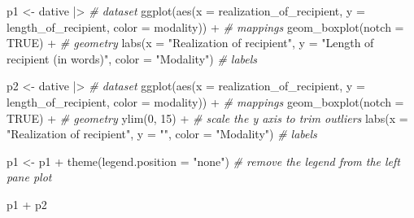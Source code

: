 \documentclass[
  letterpaper,
]{scrbook}
\newenvironment{Shaded}{\begin{snugshade}}{\end{snugshade}}
\newcommand{\AttributeTok}[1]{\textcolor[rgb]{0.00,0.00,0.00}{#1}}
\newcommand{\CommentTok}[1]{\textcolor[rgb]{0.00,0.00,0.00}{\textit{#1}}}
\newcommand{\ConstantTok}[1]{\textcolor[rgb]{0.00,0.00,0.00}{#1}}
\newcommand{\DecValTok}[1]{\textcolor[rgb]{0.00,0.00,0.00}{#1}}
\newcommand{\FunctionTok}[1]{\textcolor[rgb]{0.00,0.00,0.00}{#1}}
\newcommand{\NormalTok}[1]{\textcolor[rgb]{0.00,0.00,0.00}{#1}}
\newcommand{\OtherTok}[1]{\textcolor[rgb]{0.00,0.00,0.00}{#1}}
\newcommand{\SpecialCharTok}[1]{\textcolor[rgb]{0.00,0.00,0.00}{#1}}
\newcommand{\StringTok}[1]{\textcolor[rgb]{0.00,0.00,0.00}{#1}}
\begin{document}
\begin{Shaded}
\begin{Highlighting}[]
\NormalTok{p1 }\OtherTok{\textless{}{-}} 
\NormalTok{  dative }\SpecialCharTok{|\textgreater{}} \CommentTok{\# dataset}
  \FunctionTok{ggplot}\NormalTok{(}\FunctionTok{aes}\NormalTok{(}\AttributeTok{x =}\NormalTok{ realization\_of\_recipient, }\AttributeTok{y =}\NormalTok{ length\_of\_recipient, }\AttributeTok{color =}\NormalTok{ modality)) }\SpecialCharTok{+} \CommentTok{\# mappings}
  \FunctionTok{geom\_boxplot}\NormalTok{(}\AttributeTok{notch =} \ConstantTok{TRUE}\NormalTok{) }\SpecialCharTok{+} \CommentTok{\# geometry}
  \FunctionTok{labs}\NormalTok{(}\AttributeTok{x =} \StringTok{"Realization of recipient"}\NormalTok{, }\AttributeTok{y =} \StringTok{"Length of recipient (in words)"}\NormalTok{, }\AttributeTok{color =} \StringTok{"Modality"}\NormalTok{) }\CommentTok{\# labels}

\NormalTok{p2 }\OtherTok{\textless{}{-}} 
\NormalTok{  dative }\SpecialCharTok{|\textgreater{}} \CommentTok{\# dataset}
  \FunctionTok{ggplot}\NormalTok{(}\FunctionTok{aes}\NormalTok{(}\AttributeTok{x =}\NormalTok{ realization\_of\_recipient, }\AttributeTok{y =}\NormalTok{ length\_of\_recipient, }\AttributeTok{color =}\NormalTok{ modality)) }\SpecialCharTok{+} \CommentTok{\# mappings}
  \FunctionTok{geom\_boxplot}\NormalTok{(}\AttributeTok{notch =} \ConstantTok{TRUE}\NormalTok{) }\SpecialCharTok{+} \CommentTok{\# geometry}
  \FunctionTok{ylim}\NormalTok{(}\DecValTok{0}\NormalTok{, }\DecValTok{15}\NormalTok{) }\SpecialCharTok{+} \CommentTok{\# scale the y axis to trim outliers}
  \FunctionTok{labs}\NormalTok{(}\AttributeTok{x =} \StringTok{"Realization of recipient"}\NormalTok{, }\AttributeTok{y =} \StringTok{""}\NormalTok{, }\AttributeTok{color =} \StringTok{"Modality"}\NormalTok{) }\CommentTok{\# labels}

\NormalTok{p1 }\OtherTok{\textless{}{-}}\NormalTok{ p1 }\SpecialCharTok{+} \FunctionTok{theme}\NormalTok{(}\AttributeTok{legend.position =} \StringTok{"none"}\NormalTok{) }\CommentTok{\# remove the legend from the left pane plot}

\NormalTok{p1 }\SpecialCharTok{+}\NormalTok{ p2}
\end{Highlighting}
\end{Shaded}
\end{document}
